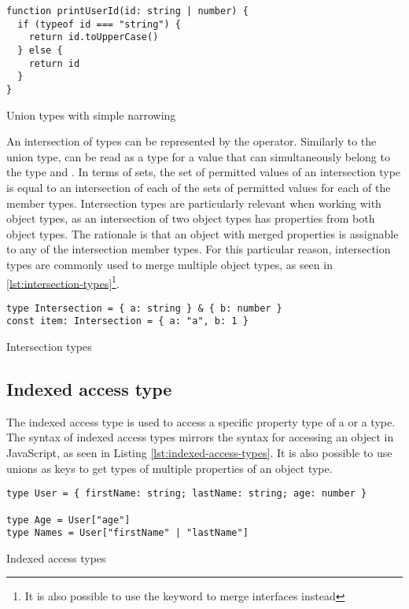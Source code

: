 \begin{listing}[ht]
  \begin{verbatim}
function printUserId(id: string | number) {
  if (typeof id === "string") {
    return id.toUpperCase()
  } else {
    return id
  }
}
  \end{verbatim}
  \caption{Union types with simple narrowing}\label{lst:union-types}
\end{listing}

An intersection of types can be represented by the \code{\&} operator. Similarly to the union type,  can be read as a type for a value that can simultaneously belong to the type  and . In terms of sets, the set of permitted values of an intersection type is equal to an intersection of each of the sets of permitted values for each of the member types. Intersection types are particularly relevant when working with object types, as an intersection of two object types has properties from both object types. The rationale is that an object with merged properties is assignable to any of the intersection member types. For this particular reason, intersection types are commonly used to merge multiple object types, as seen in \ref{lst:intersection-types}\footnote{It is also possible to use the  keyword to merge interfaces instead}.

\begin{listing}[ht]
  \begin{verbatim}
type Intersection = { a: string } & { b: number }
const item: Intersection = { a: "a", b: 1 }
  \end{verbatim}
  \caption{Intersection types}\label{lst:intersection-types}
\end{listing}

\subsection{Indexed access type}

The indexed access type is used to access a specific property type of a  or a  type. The syntax of indexed access types mirrors the syntax for accessing an object in JavaScript, as seen in Listing \ref{lst:indexed-access-types}. It is also possible to use unions as keys to get types of multiple properties of an object type.

\begin{listing}[ht]
  \begin{verbatim}
type User = { firstName: string; lastName: string; age: number }

type Age = User["age"] 
type Names = User["firstName" | "lastName"]
\end{verbatim}
  \caption{Indexed access types}\label{lst:indexed-access-types}
\end{listing}

